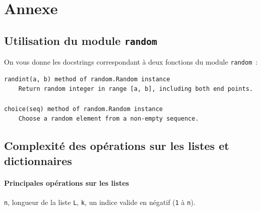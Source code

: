 %	








\section*{Annexe}

\subsection*{Utilisation du module \texttt{random}}

On vous donne les docstrings correspondant à deux fonctions du module \texttt{random}~: 

\begin{lstlisting}
randint(a, b) method of random.Random instance
    Return random integer in range [a, b], including both end points.
	
choice(seq) method of random.Random instance
    Choose a random element from a non-empty sequence.
\end{lstlisting}

\subsection*{Complexité des opérations sur les listes et dictionnaires}

\paragraph*{Principales opérations sur les listes}

\texttt{n}, longueur de la liste \texttt{L}, \texttt{k}, un indice valide en négatif (\texttt{1} à \texttt{n}).


